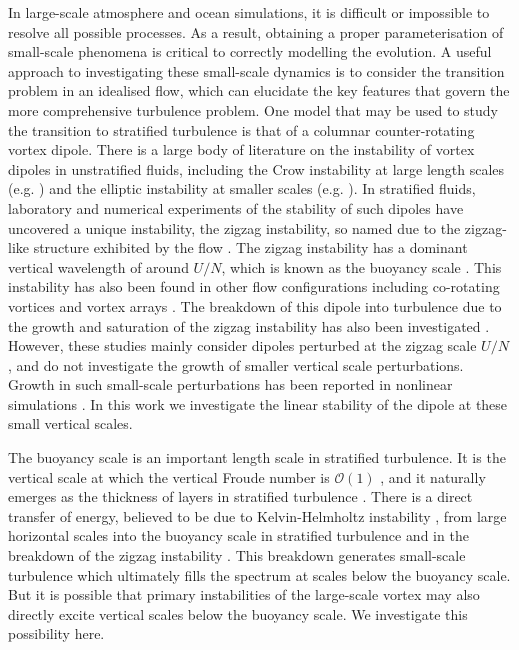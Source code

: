 In large-scale atmosphere and ocean simulations, it is difficult or impossible to resolve all possible processes. As a result, obtaining a proper parameterisation of small-scale phenomena is critical to correctly modelling the evolution. A useful approach to investigating these small-scale dynamics is to consider the transition problem in an idealised flow, which can elucidate the key features that govern the more comprehensive turbulence problem. One model that may be used to study the transition to stratified turbulence is that of a columnar counter-rotating vortex dipole. There is a large body of literature on the instability of vortex dipoles in unstratified fluids, including the Crow instability at large length scales (e.g. \cite{crow1970,widnall1974,leweke1998b}) and the elliptic instability at smaller scales (e.g. \cite{widnall1974,pierrehumbert1986,baily1986,waleffe1990}). In stratified fluids, laboratory and numerical experiments of the stability of such dipoles have uncovered a unique instability, the zigzag instability, so named due to the zigzag-like structure exhibited by the flow \cite{bc2000a,bc2000c}. The zigzag instability has a dominant vertical wavelength of around $U/N$, which is known as the buoyancy scale \cite{waite2011}. This instability has also been found in other flow configurations including co-rotating vortices \cite{otheguybc} and vortex arrays \cite{delonclebc2011}. The breakdown of this dipole into turbulence due to the growth and saturation of the zigzag instability has also been investigated \cite{waitesmol2008,augierbillant2011,delonclebc2008}. However, these studies mainly consider dipoles perturbed at the zigzag scale $U/N$, and do not investigate the growth of smaller vertical scale perturbations. Growth in such small-scale perturbations has been reported in nonlinear simulations \cite{waitesmol2008}. In this work we investigate the linear stability of the dipole at these small vertical scales. 

The buoyancy scale is an important length scale in stratified turbulence. It is the vertical scale at which the vertical Froude number is $\mathcal{O}(1)$ \cite{bc2001}, and it naturally emerges as the thickness of layers in stratified turbulence \cite{bc2001,waitebartello2004}. There is a direct transfer of energy, believed to be due to Kelvin-Helmholtz instability \cite{waite2011,augier2012}, from large horizontal scales into the buoyancy scale in stratified turbulence \cite{waite2011} and in the breakdown of the zigzag instability \cite{augier2012}. This breakdown generates small-scale turbulence which ultimately fills the spectrum at scales below the buoyancy scale. But it is possible that primary instabilities of the large-scale vortex may also directly excite vertical scales below the buoyancy scale. We investigate this possibility here. 

